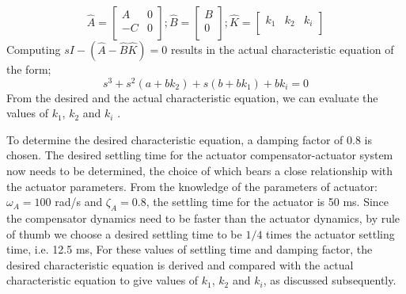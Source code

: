 \documentclass[conference]{IEEEtran}
\begin{document}
%
$$
\hat A=\left[
\begin{array}{cc}
A & 0\\
-C & 0\\
\end{array}\right]; 
\hat B=\left[
\begin{array}{c}
B\\
0\\
\end{array}\right]; 
\hat K=\left[
\begin{array}{ccc}
k_1 & k_2 & k_i\\
\end{array}\right]
$$
% 
Computing $sI-(\hat A-\hat B\hat K)=0$ results in the actual characteristic equation of the form;
%
\begin{equation}
s^3+s^2(a+bk_2)+s(b+bk_1)+bk_i=0
\label{eq25}
\end{equation}
%
From the desired and the actual characteristic equation, we can evaluate the values of $k_1$, $k_2$ and $k_i$ .

To determine the desired characteristic equation, a damping factor of 0.8 is chosen. The desired settling time for the actuator compensator-actuator system now needs to be determined, the choice of which bears a close relationship with the actuator parameters. From the knowledge of the parameters of actuator: $\omega_A=100$ rad/s and $\zeta_A = 0.8$, the settling time for the actuator is 50 ms. Since the compensator dynamics need to be faster than the actuator dynamics, by rule of thumb we choose a desired settling time to be $1/4$ times the actuator settling time, i.e. 12.5 ms, For these values of settling time and damping factor, the desired characteristic equation is derived and compared with the actual characteristic equation to give values of $k_1$, $k_2$ and $k_i$, as discussed subsequently. 
\end{document}
